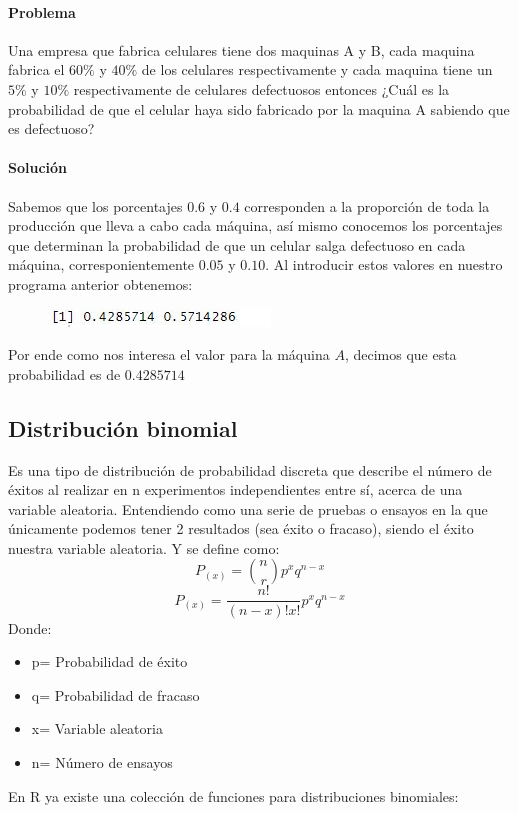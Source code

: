 \documentclass[12pt,hidelinks]{article}
\begin{document}
\paragraph{Problema}Una empresa que fabrica celulares tiene dos maquinas A y B, cada maquina fabrica el $60\%$ y $40\%$ de los celulares respectivamente y cada maquina tiene un $5\%$ y $10\%$ respectivamente de celulares defectuosos entonces ¿Cuál es la probabilidad de que el celular haya sido fabricado por la maquina A sabiendo que es defectuoso?

\paragraph{Solución} Sabemos que los porcentajes $0.6$ y $0.4$ corresponden a la proporción de toda la producción que lleva a cabo cada máquina, así mismo conocemos los porcentajes que determinan la probabilidad de que un celular salga defectuoso en cada máquina, corresponientemente $0.05$ y $0.10$. Al introducir estos valores en nuestro programa anterior obtenemos:
\begin{figure}[h!]
	\centering
	\includegraphics[width=0.4\linewidth]{images/3/Bayes.JPG}
\end{figure}
Por ende como nos interesa el valor para la máquina $A$, decimos que esta probabilidad es de $ 0.4285714$ 
\subsection{Distribución binomial}
Es una tipo de distribución de probabilidad discreta que describe el número de éxitos al realizar en n experimentos independientes entre sí, acerca de una variable aleatoria. Entendiendo como una serie de pruebas o ensayos en la que únicamente podemos tener 2 resultados (sea éxito o fracaso), siendo el éxito nuestra variable aleatoria. Y se define como:
\[P_{(x)}={n \choose r} p^{x}q^{n-x}\]
\[P_{(x)}=\frac{n!}{(n-x)!x!}p^{x}q^{n-x}\]
Donde:
\begin{itemize}
	\item p= Probabilidad de éxito
	\item q= Probabilidad de fracaso
	\item x= Variable aleatoria
	\item n= Número de ensayos 
\end{itemize}
En R ya existe una colección de funciones para distribuciones binomiales:
\end{document}
